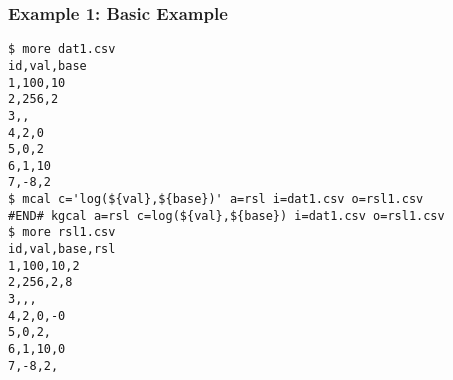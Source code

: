 \subsubsection*{Example 1: Basic Example}



\begin{Verbatim}[baselinestretch=0.7,frame=single]
$ more dat1.csv
id,val,base
1,100,10
2,256,2
3,,
4,2,0
5,0,2
6,1,10
7,-8,2
$ mcal c='log(${val},${base})' a=rsl i=dat1.csv o=rsl1.csv
#END# kgcal a=rsl c=log(${val},${base}) i=dat1.csv o=rsl1.csv
$ more rsl1.csv
id,val,base,rsl
1,100,10,2
2,256,2,8
3,,,
4,2,0,-0
5,0,2,
6,1,10,0
7,-8,2,
\end{Verbatim}
